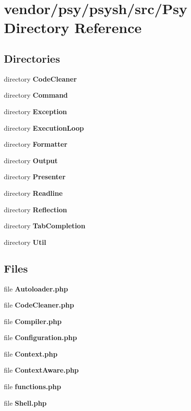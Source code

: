 \section{vendor/psy/psysh/src/\+Psy Directory Reference}
\label{dir_db632d944d885d919049751f96097fee}
\subsection*{Directories}
\begin{DoxyCompactItemize}
\item 
directory {\bf Code\+Cleaner}
\item 
directory {\bf Command}
\item 
directory {\bf Exception}
\item 
directory {\bf Execution\+Loop}
\item 
directory {\bf Formatter}
\item 
directory {\bf Output}
\item 
directory {\bf Presenter}
\item 
directory {\bf Readline}
\item 
directory {\bf Reflection}
\item 
directory {\bf Tab\+Completion}
\item 
directory {\bf Util}
\end{DoxyCompactItemize}
\subsection*{Files}
\begin{DoxyCompactItemize}
\item 
file {\bf Autoloader.\+php}
\item 
file {\bf Code\+Cleaner.\+php}
\item 
file {\bf Compiler.\+php}
\item 
file {\bf Configuration.\+php}
\item 
file {\bf Context.\+php}
\item 
file {\bf Context\+Aware.\+php}
\item 
file {\bf functions.\+php}
\item 
file {\bf Shell.\+php}
\end{DoxyCompactItemize}

